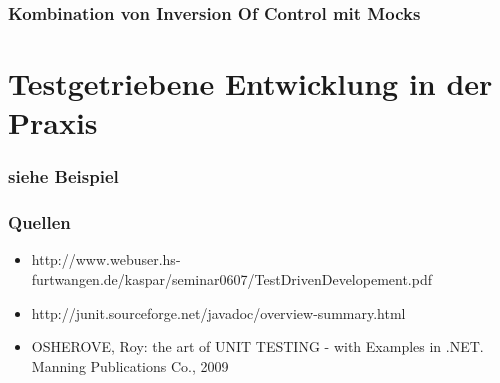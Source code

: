 \documentclass{beamer}
\begin{document}
\begin{frame}
\frametitle{Kombination von Inversion Of Control mit Mocks}
\end{frame}

\section{Testgetriebene Entwicklung in der Praxis}
\begin{frame}
\frametitle{siehe Beispiel}
\end{frame}

\begin{appendix}
\begin{frame}
\frametitle{Quellen}
\begin{itemize}
\item http://www.webuser.hs-furtwangen.de/kaspar/seminar0607/TestDrivenDevelopement.pdf
\item http://junit.sourceforge.net/javadoc/overview-summary.html
\item OSHEROVE, Roy: the art of UNIT TESTING - with Examples in .NET. Manning Publications Co., 2009
\end{itemize}
\end{frame}
\end{appendix}
\end{document}
